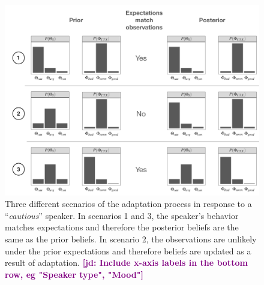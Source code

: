 \documentclass[man,floatsintext]{apa6}
\newcommand{\jd}[1]{\textcolor{Purple}{\bf [jd: #1]}}
\begin{document}
\begin{figure}[th!]
     \includegraphics[width=\columnwidth]{adaptation-paths}
    \caption{Three different scenarios of the adaptation process in response to a ``\textit{cautious}'' speaker. In scenarios 1 and 3, the speaker's behavior matches expectations and therefore the posterior beliefs are the same as the prior beliefs. In scenario 2, the observations are unlikely under the prior expectations and therefore beliefs are updated as a result of adaptation. \jd{Include x-axis labels in the bottom row, eg "Speaker type", "Mood"}}
    \label{fig:adaptation-scenarios}
\end{figure}
\end{document}
